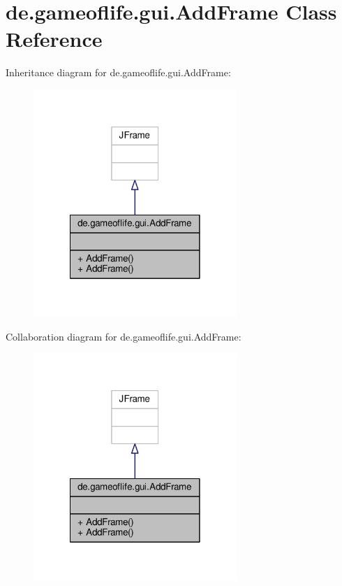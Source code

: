 \hypertarget{classde_1_1gameoflife_1_1gui_1_1AddFrame}{\section{de.\-gameoflife.\-gui.\-Add\-Frame Class Reference}
\label{classde_1_1gameoflife_1_1gui_1_1AddFrame}
}


Inheritance diagram for de.\-gameoflife.\-gui.\-Add\-Frame\-:\nopagebreak
\begin{figure}[H]
\begin{center}
\leavevmode
\includegraphics[width=218pt]{classde_1_1gameoflife_1_1gui_1_1AddFrame__inherit__graph}
\end{center}
\end{figure}


Collaboration diagram for de.\-gameoflife.\-gui.\-Add\-Frame\-:\nopagebreak
\begin{figure}[H]
\begin{center}
\leavevmode
\includegraphics[width=218pt]{classde_1_1gameoflife_1_1gui_1_1AddFrame__coll__graph}
\end{center}
\end{figure}
